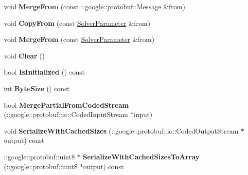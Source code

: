\begin{DoxyCompactItemize}
void {\bfseries Merge\+From} (const \+::google\+::protobuf\+::\+Message \&from)
\item 
\mbox{\label{classcaffe_1_1_solver_parameter_acd2fd0b299e7efd8002dbd9d1283f73e}} 
void {\bfseries Copy\+From} (const \mbox{\hyperlink{classcaffe_1_1_solver_parameter}{Solver\+Parameter}} \&from)
\item 
\mbox{\label{classcaffe_1_1_solver_parameter_a2d0b2807ba8f02a6acbee864f3827c6b}} 
void {\bfseries Merge\+From} (const \mbox{\hyperlink{classcaffe_1_1_solver_parameter}{Solver\+Parameter}} \&from)
\item 
\mbox{\label{classcaffe_1_1_solver_parameter_a9731a70d11ad9cfd4872e6e8e562e9e1}} 
void {\bfseries Clear} ()
\item 
\mbox{\label{classcaffe_1_1_solver_parameter_a7838f937caac04de9cfe218ed9667789}} 
bool {\bfseries Is\+Initialized} () const
\item 
\mbox{\label{classcaffe_1_1_solver_parameter_ae52711c2fa7c63fe5f0d9479839b0a4a}} 
int {\bfseries Byte\+Size} () const
\item 
\mbox{\label{classcaffe_1_1_solver_parameter_a7a8fd4731d677ede6b7b25c412efb6a7}} 
bool {\bfseries Merge\+Partial\+From\+Coded\+Stream} (\+::google\+::protobuf\+::io\+::\+Coded\+Input\+Stream $\ast$input)
\item 
\mbox{\label{classcaffe_1_1_solver_parameter_a264deecface25d02fbc1ab6491d4863c}} 
void {\bfseries Serialize\+With\+Cached\+Sizes} (\+::google\+::protobuf\+::io\+::\+Coded\+Output\+Stream $\ast$output) const
\item 
\mbox{\label{classcaffe_1_1_solver_parameter_aeadca80d5846c55e49fd1c541ab0b7fc}} 
\+::google\+::protobuf\+::uint8 $\ast$ {\bfseries Serialize\+With\+Cached\+Sizes\+To\+Array} (\+::google\+::protobuf\+::uint8 $\ast$output) const
\item 
\mbox{\label{classcaffe_1_1_solver_parameter_a8eea9ea4ae5e48c18553715d334a6100}} 

\end{DoxyCompactItemize}
